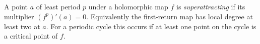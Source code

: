 
A point $a$ of least period $p$ under a holomorphic map $f$ is \emph{superattracting} if its multiplier $(f^p)'(a)=0$. Equivalently the first-return map has local degree at least two at $a$. For a periodic cycle this occurs if at least one point on the cycle is a critical point of $f$.
